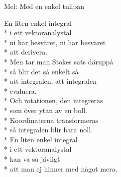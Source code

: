 \begin{SongText}[Integralvisan]
    \begin{SongInfo}
        Mel: Med en enkel tulipan
    \end{SongInfo}
    \begin{SongVerse}
        En liten enkel integral\\*%
        i ett vektoranalystal\\*%
        ni har besväret, ni har besväret\\*%
        att derivera.\\*%
        Men tar man Stokes sats däruppå\\*%
        så blir det så enkelt så\\*%
        att integralen, att integralen\\*%
        evaluera.\\*%
        Och rotationen, den integreras\\*%
        som över ytan av en boll.\\*%
        Koordinaterna transformeras\\*%
        så integralen blir bara noll.\\*%
        En liten enkel integral\\*%
        i ett vektoranalystal\\*%
        kan va så jävligt\\*%
        att man ej hinner med något mera.
    \end{SongVerse}
\end{SongText}